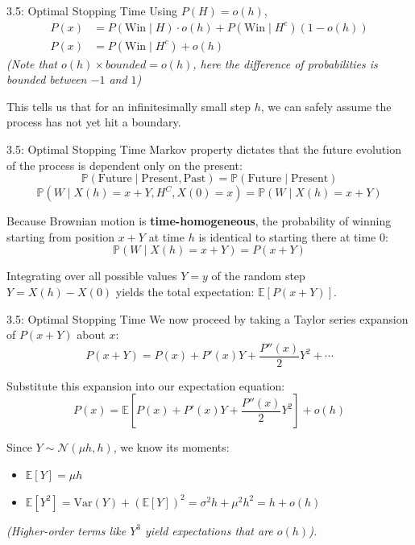 \documentclass{beamer}
\begin{document}
	\begin{frame}{3.5: Optimal Stopping Time}
		Using $P(H) = o(h)$,
		\begin{align*}
			P(x) &= P(\text{Win} \mid H) \cdot o(h) + P(\text{Win} \mid H^c) (1 - o(h)) \\
			P(x) &= P(\text{Win} \mid H^c) + o(h)
		\end{align*}
		\textit{(Note that $o(h) \times bounded = o(h)$, here the difference of probabilities is bounded between $-1$ and $1$)}
		
		\vspace{0.3cm}
		This tells us that for an infinitesimally small step $h$, we can safely assume the process has not yet hit a boundary. 
		
	\end{frame}
	
	\begin{frame}{3.5: Optimal Stopping Time}
		Markov property dictates that the future evolution of the process is dependent only on the present:
		$$ \mathbb{P}(\text{Future} \mid \text{Present}, \text{Past}) = \mathbb{P}(\text{Future} \mid \text{Present}) $$
		$$ \mathbb{P}(W \mid X(h) = x+Y, H^C, X(0) = x) = \mathbb{P}(W \mid X(h) = x+Y) $$
		
		Because Brownian motion is \textbf{time-homogeneous}, the probability of winning starting from position $x+Y$ at time $h$ is identical to starting there at time $0$:
		$$ \mathbb{P}(W \mid X(h) = x+Y) = P(x+Y) $$
		
		Integrating over all possible values $Y=y$ of the random step $Y = X(h) - X(0)$ yields the total expectation: $\mathbb{E}[P(x+Y)]$.
	\end{frame}
	
	\begin{frame}{3.5: Optimal Stopping Time}
		We now proceed by taking a Taylor series expansion of $P(x + Y)$ about $x$:
		$$P(x+Y) = P(x) + P'(x)Y + \frac{P''(x)}{2}Y^2 + \cdots$$
		
		\vspace{0.3cm}
		Substitute this expansion into our expectation equation:
		$$P(x) = \mathbb{E}\left[P(x) + P'(x)Y + \frac{P''(x)}{2}Y^2\right] + o(h)$$
		
		\vspace{0.3cm}
		Since $Y \sim \mathcal{N}(\mu h, h)$, we know its moments:
		\begin{itemize}
			\item $\mathbb{E}[Y] = \mu h$
			\item $\mathbb{E}[Y^2] = \text{Var}(Y) + (\mathbb{E}[Y])^2 = \sigma^2h + \mu^2 h^2 = h + o(h)$
		\end{itemize}
		\textit{(Higher-order terms like $Y^3$ yield expectations that are $o(h)$).}
	\end{frame}
	
\end{document}
